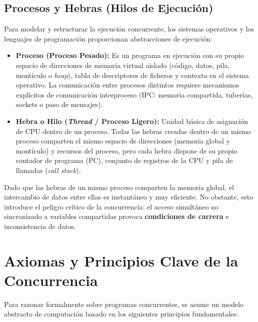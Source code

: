 \subsection{Procesos y Hebras (Hilos de Ejecución)}
Para modelar y estructurar la ejecución concurrente, los sistemas operativos y los lenguajes de programación proporcionan abstracciones de ejecución:

\begin{itemize}[leftmargin=*]
    \item \textbf{Proceso (Proceso Pesado):} Es un programa en ejecución con su propio espacio de direcciones de memoria virtual aislado (código, datos, pila, montículo o \textit{heap}), tabla de descriptores de ficheros y contexto en el sistema operativo. La comunicación entre procesos distintos requiere mecanismos explícitos de comunicación interproceso (IPC: memoria compartida, tuberías, sockets o paso de mensajes).
    \item \textbf{Hebra o Hilo (\textit{Thread} / Proceso Ligero):} Unidad básica de asignación de CPU dentro de un proceso. Todas las hebras creadas dentro de un mismo proceso comparten el mismo espacio de direcciones (memoria global y montículo) y recursos del proceso, pero cada hebra dispone de su propio contador de programa (PC), conjunto de registros de la CPU y pila de llamadas (\textit{call stack}).
\end{itemize}

\begin{aviso}
Dado que las hebras de un mismo proceso comparten la memoria global, el intercambio de datos entre ellas es instantáneo y muy eficiente. No obstante, esto introduce el peligro crítico de la concurrencia: el acceso simultáneo no sincronizado a variables compartidas provoca \textbf{condiciones de carrera} e inconsistencia de datos.
\end{aviso}

\section{Axiomas y Principios Clave de la Concurrencia}

Para razonar formalmente sobre programas concurrentes, se asume un modelo abstracto de computación basado en los siguientes principios fundamentales:

